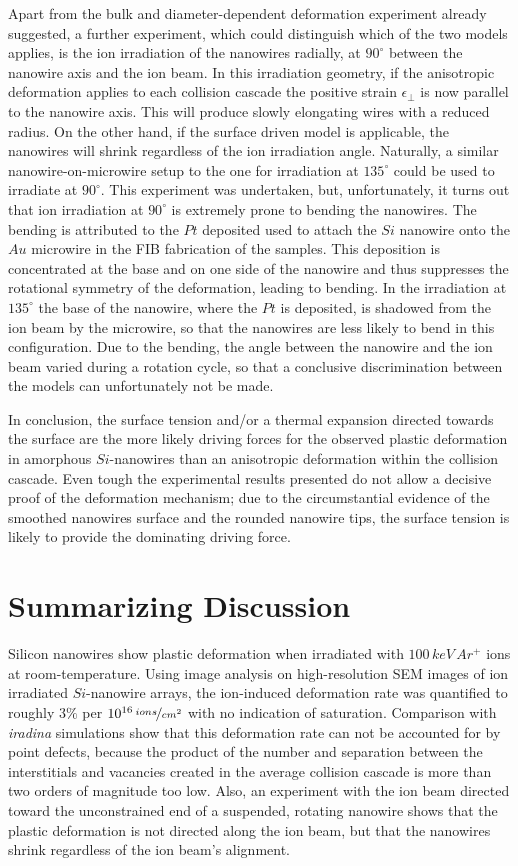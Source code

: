 Apart from the bulk and diameter-dependent deformation experiment already suggested, a further experiment, which could distinguish which of the two models applies, is the ion irradiation of the nanowires radially, at $90^\circ$ between the nanowire axis and the ion beam. In this irradiation geometry, if the anisotropic deformation applies to each collision cascade the positive strain $\epsilon_{\perp}$ is now parallel to the nanowire axis. This will produce slowly elongating wires with a reduced radius. On the other hand, if the surface driven model is applicable, the nanowires will shrink regardless of the ion irradiation angle. Naturally, a similar nanowire-on-microwire setup to the one for irradiation at $135^\circ$ could be used to irradiate at $90^\circ$. This experiment was undertaken, but, unfortunately, it turns out that ion irradiation at $90^\circ$ is extremely prone to bending the nanowires. The bending is attributed to the $Pt$ deposited used to attach the $Si$ nanowire onto the $Au$ microwire in the FIB fabrication of the samples. This deposition is concentrated at the base and on one side of the nanowire and thus suppresses the rotational symmetry of the deformation, leading to bending. In the irradiation at $135^\circ$ the base of the nanowire, where the $Pt$ is deposited, is shadowed from the ion beam by the microwire, so that the nanowires are less likely to bend in this configuration. Due to the bending, the angle between the nanowire and the ion beam varied during a rotation cycle, so that a conclusive discrimination between the models can unfortunately not be made. 

In conclusion, the surface tension and/or a thermal expansion directed towards the surface are the more likely driving forces for the observed plastic deformation in amorphous $Si$-nanowires than an anisotropic deformation within the collision cascade. Even tough the experimental results presented do not allow a decisive proof of the deformation mechanism; due to the circumstantial evidence of the smoothed nanowires surface and the rounded nanowire tips, the surface tension is likely to provide the dominating driving force.


\section{Summarizing Discussion}

Silicon nanowires show plastic deformation when irradiated with $100\,keV\,Ar^+$ ions at room-temperature. Using image analysis on high-resolution SEM images of ion irradiated $Si$-nanowire arrays, the ion-induced deformation rate was quantified to roughly $3\%$ per $10^{16}\,\nicefrac{ions}{cm^2}$ with no indication of saturation. Comparison with \emph{iradina} simulations show that this deformation rate can not be accounted for by point defects, because the product of the number and separation between the interstitials and vacancies created in the average collision cascade is more than two orders of magnitude too low. Also, an experiment with the ion beam directed toward the unconstrained end of a suspended, rotating nanowire shows that the plastic deformation is not directed along the ion beam, but that the nanowires shrink regardless of the ion beam's alignment.

